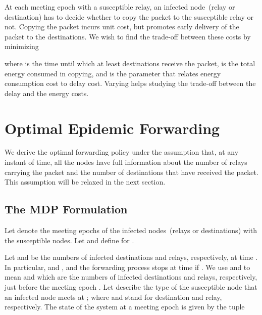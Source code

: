 \documentclass[10pt,journal,letterpaper]{IEEEtran}
\newtheorem{remarks}{Remarks}[section]
\newcommand{\remove}[1]{}
\begin{document}
\remove{
 The goal is to deliver the packet to a fraction
~() of the  destinations within a short
duration. Thanks to the intermittent connectivity, nodes only have
beliefs about the number of infected destinations. Let
 be a time such that with high probability the
fraction of infected nodes at  is close to .
More precisely, if  is the number of infected destinations at
time , then for any ,

We want to shorten . }

At each meeting epoch with a susceptible relay, an infected
node~(relay or destination) has to decide whether to copy the
packet to the susceptible relay or not. Copying the packet incurs
unit cost, but promotes early delivery of the packet to the
destinations.
We wish to find the trade-off between these costs by minimizing

where  is the time until which at least  destinations receive the packet,
 is the total energy consumed
in copying, and  is the parameter that relates
energy consumption cost to delay cost. Varying  helps studying
the trade-off between the delay and the energy costs.

\remove{
\begin{remarks}
In the presence of complete information, every node knows when
the desired fraction of destinations receive the packet.
Thus no copying is done to the remaining susceptible destinations. In the case
of partial information copying to the susceptible destinations is stopped
at . This ensures that the fraction of infected destinations is
close to .
\end{remarks}
}
\section{Optimal Epidemic Forwarding}
\label{forwarding-policy}
We derive the optimal forwarding policy under the assumption that, at any instant of time,
all the nodes have full information about the number of relays carrying the
packet and the number of destinations that have received the packet.
This assumption will be relaxed in the next section.

\subsection{The MDP Formulation}
\label{sec:mdp-formulation}
Let  denote the meeting epochs of the infected
nodes~(relays or destinations) with the susceptible nodes. Let  and define  for .

Let  and  be the numbers of infected destinations and
relays, respectively, at time . In particular,  and
, and the forwarding process stops at time  if . We use  and  to mean  and  which are the numbers
of infected destinations and relays, respectively,  just before the meeting epoch .
Let  describe the type of the susceptible node
that an infected node meets at ;  where  and  stand for destination and relay,
respectively. The state of the system at a meeting epoch  is
given by the tuple
\end{document}
